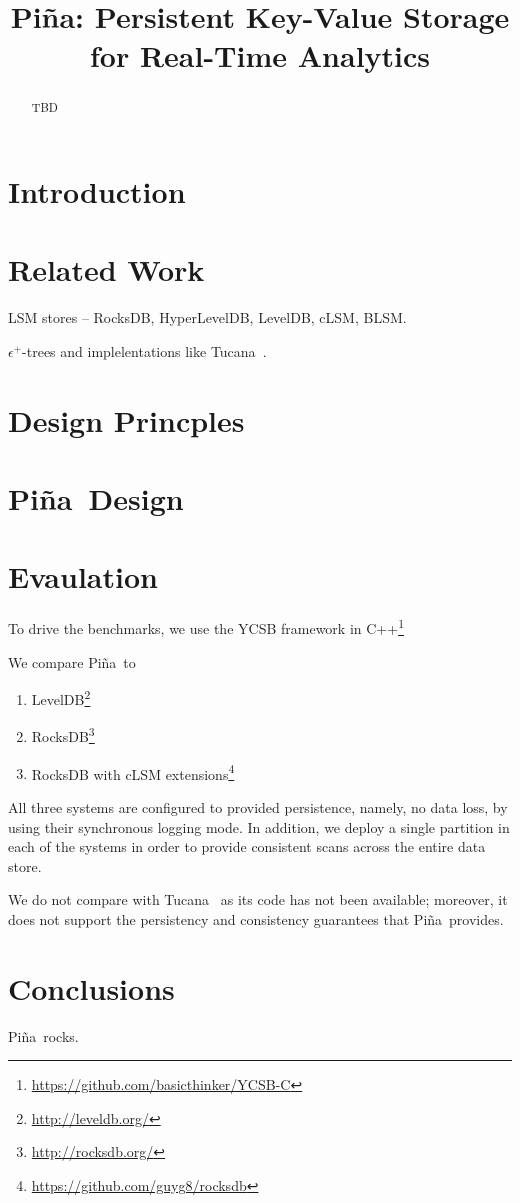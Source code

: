 \documentclass[10pt,preprint,numbers]{sigplanconf}
\date{}
\newcommand{\sys}{Pi\~na}
\begin{document}
\title{\sys: Persistent Key-Value Storage for Real-Time Analytics} 
\maketitle

\begin{abstract}

TBD

\end{abstract}

\section{Introduction}


\section{Related Work}
\label{sec:related}

LSM stores -- RocksDB, HyperLevelDB, LevelDB, cLSM, BLSM.

$\epsilon^+$-trees and implelentations like Tucana~\cite{tucana}.


\section{Design Princples}
\label{sec:principles}


\section{\sys\ Design}
\label{sec:design}



\section{Evaulation}
\label{sec:eval}

To drive the benchmarks, we use the 
YCSB framework in C++\footnote{\url{https://github.com/basicthinker/YCSB-C}}  

We compare \sys\ to 
\begin{enumerate}
\item
LevelDB\footnote{\url{http://leveldb.org/}}
\item
RocksDB\footnote{\url{http://rocksdb.org/}}
\item
RocksDB with cLSM extensions\footnote{\url{https://github.com/guyg8/rocksdb}}
\end{enumerate}
All three systems are configured to provided persistence, namely, no data loss, by using their synchronous logging mode.
In addition, we deploy a single partition in each of the systems in order to provide consistent scans across the entire data store.

We do not compare with Tucana~\cite{tucana} as its code has not been available; moreover, it does not support the persistency and consistency guarantees that \sys\ provides. 


\section{Conclusions}
\label{sec:conclusions}
\sys\ rocks.


 
\end{document}
